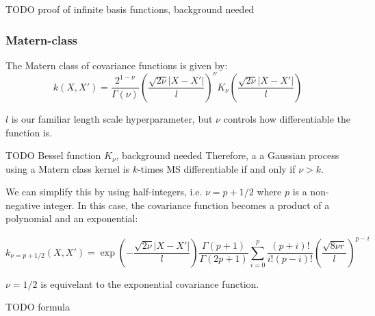 \documentclass[10pt]{article}
\begin{document}
TODO proof of infinite basis functions, background needed



\newpage
\subsubsection{Matern-class}
The Matern class of covariance functions is given by:
\begin{equation*}
    k(X,X') = \frac{2^{1 - \nu}}{\Gamma(\nu)}\left(\frac{\sqrt{2\nu}|X - X'|}{l}\right)^{\nu}K_{\nu}\left(\frac{\sqrt{2\nu}|X - X'|}{l}\right)
\end{equation*}

$l$ is our familiar length scale hyperparameter, but $\nu$ controls how differentiable the function is. 

TODO Bessel function $K_{\nu}$, background needed
Therefore, a a Gaussian process using a Matern class kernel is $k$-times MS differentiable if and only if $\nu > k$. 

We can simplify this by using half-integers, i.e. $\nu = p + 1/2$ where $p$ is a non-negative integer. In this case, the covariance function becomes a product of a polynomial and an exponential:

\begin{equation*}
    k_{\nu = p + 1/2}(X,X') = \exp \left(- \frac{\sqrt{2\nu}|X - X'|}{l} \right) \frac{\Gamma(p+1)}{\Gamma(2p+1)} \sum_{i=0}^p \frac{(p + i)!}{i!(p-i)!} \left( \frac{\sqrt{8\nu r}}{l} \right)^{p-i}
\end{equation*}

$\nu = 1/2$ is equivelant to the exponential covariance function.

TODO formula
\end{document}
